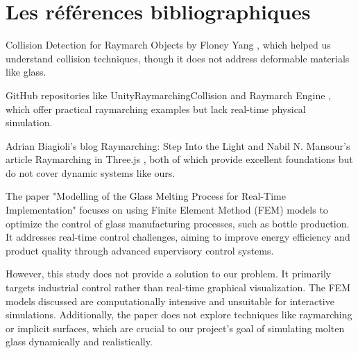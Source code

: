\documentclass{rapportcs}
\begin{document}
    \section{Les références bibliographiques}
   Collision Detection for Raymarch Objects by Floney Yang \cite{yang_raymarching_2024}, which helped us understand collision techniques, though it does not address deformable materials like glass.

    GitHub repositories like UnityRaymarchingCollision \cite{hecomi_raymarching_2024} and Raymarch Engine \cite{koskimies_raymarching_2024}, which offer practical raymarching examples but lack real-time physical simulation.

    Adrian Biagioli's blog \cite{biagioli_raymarching_2024} Raymarching: Step Into the Light and Nabil N. Mansour's article Raymarching in Three.js \cite{mansour_sdf_2024}, both of which provide excellent foundations but do not cover dynamic systems like ours.

    The paper "Modelling of the Glass Melting Process for Real-Time Implementation" \cite{agh_university_of_science_and_technology_in_krakow_30-059_krakow_mickiewicza_av_30_poland_modelling_2015} focuses on using Finite Element Method (FEM) models to optimize the control of glass manufacturing processes, such as bottle production. It addresses real-time control challenges, aiming to improve energy efficiency and product quality through advanced supervisory control systems.

    However, this study does not provide a solution to our problem. It primarily targets industrial control rather than real-time graphical visualization. The FEM models discussed are computationally intensive and unsuitable for interactive simulations. Additionally, the paper does not explore techniques like raymarching or implicit surfaces, which are crucial to our project’s goal of simulating molten glass dynamically and realistically.


    \newpage
\end{document}
